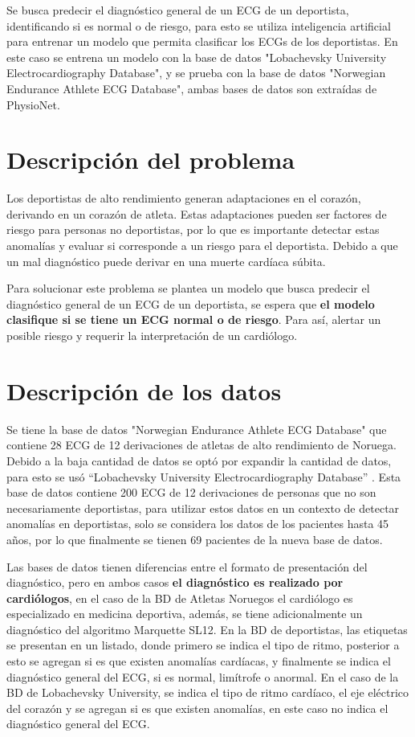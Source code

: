 \documentclass[conference]{IEEEtran}
\begin{document}
  Se busca predecir el diagnóstico general de un ECG de un deportista, identificando si es normal o de riesgo,
  para esto se utiliza inteligencia artificial para entrenar un modelo que permita clasificar los ECGs de los
    deportistas. En este caso se entrena un modelo con la base de datos "Lobachevsky University Electrocardiography Database",
    y se prueba con la base de datos "Norwegian Endurance Athlete ECG Database", 
    ambas bases de datos son extraídas de PhysioNet. 


    

\section{Descripción del problema}

Los deportistas de alto rendimiento generan adaptaciones en el corazón, derivando en un corazón de atleta. 
Estas adaptaciones pueden ser factores de riesgo para personas no deportistas, por lo que es importante 
detectar estas anomalías y evaluar si corresponde a un riesgo para el deportista. Debido a que un mal 
diagnóstico puede derivar en una muerte cardíaca súbita.

Para solucionar este problema se plantea un modelo que busca predecir el diagnóstico general de un ECG
 de un deportista, se espera que \textbf{el modelo clasifique si se tiene un ECG normal o de riesgo}. 
 Para así, alertar un posible riesgo y requerir la interpretación de un cardiólogo.


\section{Descripción de los datos}
Se tiene la base de datos "Norwegian Endurance Athlete ECG Database" \cite{b1} que contiene 28 
ECG de 12 derivaciones de atletas de alto rendimiento de Noruega. Debido a la baja cantidad de 
datos se optó por expandir la cantidad de datos, para esto se usó “Lobachevsky University 
Electrocardiography Database” \cite{b2}. Esta base de datos contiene 200 ECG de 12 derivaciones 
de personas que no son necesariamente deportistas, para utilizar estos datos en un contexto de 
detectar anomalías en deportistas, solo se considera los datos de los pacientes hasta 45 años, 
por lo que finalmente se tienen 69 pacientes de la nueva base de datos.

Las bases de datos tienen diferencias entre el formato de presentación del diagnóstico, pero en 
ambos casos \textbf{el diagnóstico es realizado por cardiólogos}, en el caso de la BD de Atletas 
Noruegos el cardiólogo es especializado en medicina deportiva, además, se tiene adicionalmente un 
diagnóstico del algoritmo Marquette SL12. En la BD de deportistas, las etiquetas se presentan en 
un listado, donde primero se indica el tipo de ritmo, posterior a esto se agregan si es que existen 
anomalías cardíacas, y finalmente se indica el diagnóstico general del ECG, si es normal, limítrofe 
o anormal. En el caso de la BD de Lobachevsky University, se indica el tipo de ritmo cardíaco, el eje 
eléctrico del corazón y se agregan si es que existen anomalías, en este caso no indica el diagnóstico general del ECG.
\end{document}
